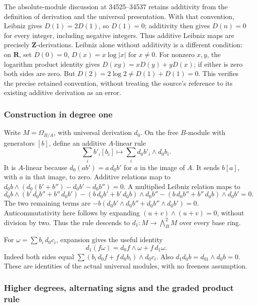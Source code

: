 The absolute-module discussion at 34525--34537 retains additivity from the definition of derivation and the universal presentation. With that convention, Leibniz gives \(D(1)=2D(1)\), so \(D(1)=0\); additivity then gives \(D(n)=0\) for every integer, including negative integers. Thus additive Leibniz maps are precisely \(\mathbf Z\)-derivations. Leibniz alone without additivity is a different condition: on \(\mathbf R\), set \(D(0)=0\), \(D(x)=x\log|x|\) for \(x\ne0\). For nonzero \(x,y\), the logarithm product identity gives \(D(xy)=xD(y)+yD(x)\); if either is zero both sides are zero. But \(D(2)=2\log2\ne D(1)+D(1)=0\). This verifies the precise retained convention, without treating the source's reference to its existing additive derivation as an error.

\subsubsection{Construction in degree one}\label{construction-in-degree-one}

Write \(M=\Omega_{B/A}\), with universal derivation \(d_0\). On the free \(B\)-module with generators \([b]\), define an additive \(A\)-linear rule \[
\sum_i b'_i[b_i]\longmapsto\sum_i d_0b'_i\wedge d_0b_i.
\] It is \(A\)-linear because \(d_0(ab')=a\,d_0b'\) for \(a\) in the image of \(A\). It sends \(b[a]\), with \(a\) in that image, to zero. Additive relations map to \(d_0b\wedge(d_0(b'+b'')-d_0b'-d_0b'')=0\). A multiplied Leibniz relation maps to \[
d_0b\wedge(b'\,d_0b''+b''\,d_0b')
-(b\,d_0b'+b'\,d_0b)\wedge d_0b''
-(b\,d_0b''+b''\,d_0b)\wedge d_0b'=0.
\] The two remaining terms are \(-b(d_0b'\wedge d_0b''+d_0b''\wedge d_0b')=0\). Anticommutativity here follows by expanding \((u+v)\wedge(u+v)=0\), without division by two. Thus the rule descends to \(d_1:M\to\bigwedge_B^2M\) over every base ring.

For \(\omega=\sum b_i\,d_0c_i\), expansion gives the useful identity \[
d_1(f\omega)=d_0f\wedge\omega+f\,d_1\omega.
\] Indeed both sides equal \(\sum (b_i\,d_0f+f\,d_0b_i)\wedge d_0c_i\). Also \(d_1d_0b=d_01\wedge d_0b=0\). These are identities of the actual universal modules, with no freeness assumption.

\subsubsection{Higher degrees, alternating signs and the graded product rule}\label{higher-degrees-alternating-signs-and-the-graded-product-rule}


